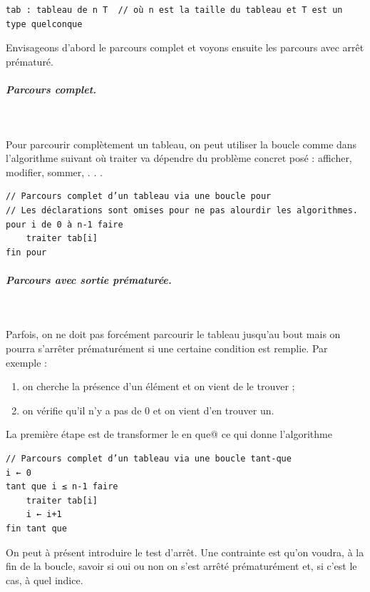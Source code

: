 \documentclass[11pt,a4paper]{article}
\begin{document}
            \par
        \begin{verbatim}
tab : tableau de n T  // où n est la taille du tableau et T est un type quelconque
      \end{verbatim}Envisageons d'abord le parcours complet et voyons ensuite les parcours avec arr\^et pr\'ematur\'e.
            \par
        
			
		\subparagraph{Parcours complet.} 
		
					\textcolor{white}{.} \par
				
		    Pour parcourir compl\`etement un tableau, on peut utiliser la boucle 
		    \verb@pour@ comme dans
        l'algorithme suivant o\`u \guillemotleft  traiter \guillemotright  va d\'ependre du probl\`eme concret pos\'e : afficher, modifier,
        sommer, . . .
      
            \par
        \begin{verbatim}
// Parcours complet d’un tableau via une boucle pour
// Les déclarations sont omises pour ne pas alourdir les algorithmes.
pour i de 0 à n-1 faire
    traiter tab[i]
fin pour
      \end{verbatim}
			
		\subparagraph{Parcours avec sortie pr\'ematur\'ee.} 
		
					\textcolor{white}{.} \par
				
        Parfois, on ne doit pas forc\'ement parcourir le tableau jusqu'au bout mais on pourra s'arr\^eter
        pr\'ematur\'ement si une certaine condition est remplie. Par exemple :
        
					\begin{enumerate}
				
			\item on cherche la pr\'esence d'un \'el\'ement et on vient de le trouver ;
			\item on v\'erifie qu'il n'y a pas de 0 et on vient d'en trouver un.
					\end{enumerate}
				
        La premi\`ere \'etape est de transformer le \verb@pour@ 
        en \verb@tant que@ ce qui donne l'algorithme
      
            \par
        \begin{verbatim}
// Parcours complet d’un tableau via une boucle tant-que
i ← 0
tant que i ≤ n-1 faire
    traiter tab[i]
    i ← i+1
fin tant que
		  \end{verbatim}
		    On peut \`a pr\'esent introduire le test d'arr\^et. Une contrainte est qu'on voudra, \`a la fin de la
        boucle, savoir si oui ou non on s'est arr\^et\'e pr\'ematur\'ement et, si c'est le cas, \`a quel indice.
      
\end{document}
